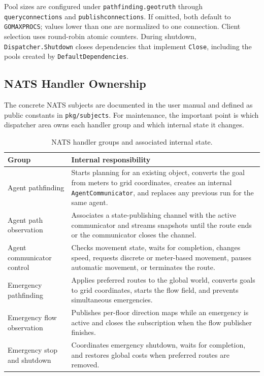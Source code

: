 \documentclass[12pt,a4paper]{report}
\begin{document}
Pool sizes are configured under \texttt{pathfinding.geotruth} through
\texttt{queryconnections} and \texttt{publishconnections}. If omitted, both
default to \texttt{GOMAXPROCS}; values lower than one are normalized to one
connection. Client selection uses round-robin atomic counters. During shutdown,
\texttt{Dispatcher.Shutdown} closes dependencies that implement \texttt{Close},
including the pools created by \texttt{DefaultDependencies}.

\subsection{NATS Handler Ownership}

The concrete NATS subjects are documented in the user manual and defined as
public constants in \texttt{pkg/subjects}. For maintenance, the important point
is which dispatcher area owns each handler group and which internal state it
changes.

\begin{table}[H]
\centering
\begin{tabular}{|p{}|p{}|}
\hline
\textbf{Group} & \textbf{Internal responsibility} \\
\hline
Agent pathfinding &
Starts planning for an existing object, converts the goal from meters to grid
coordinates, creates an internal \texttt{AgentCommunicator}, and replaces any
previous run for the same agent. \\
\hline
Agent path observation &
Associates a state-publishing channel with the active communicator and streams
snapshots until the route ends or the communicator closes the channel. \\
\hline
Agent communicator control &
Checks movement state, waits for completion, changes speed, requests discrete or
meter-based movement, pauses automatic movement, or terminates the route. \\
\hline
Emergency pathfinding &
Applies preferred routes to the global world, converts goals to grid
coordinates, starts the flow field, and prevents simultaneous emergencies. \\
\hline
Emergency flow observation &
Publishes per-floor direction maps while an emergency is active and closes the
subscription when the flow publisher finishes. \\
\hline
Emergency stop and shutdown &
Coordinates emergency shutdown, waits for completion, and restores global costs
when preferred routes are removed. \\
\hline
\end{tabular}
\caption{NATS handler groups and associated internal state.}
\end{table}
\end{document}

